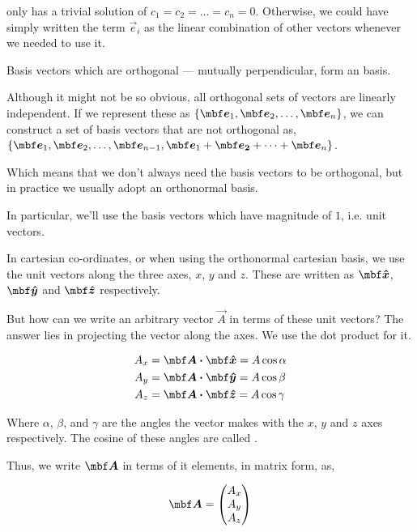 only has a trivial solution of \(c_1 = c_2 = \dots = c_n = 0\). Otherwise, we could have simply written the term \(\vec{e}_i\) as the linear combination of other vectors whenever we needed to use it.

Basis vectors which are orthogonal --- mutually perpendicular, form an  basis.

Although it might not be so obvious, all orthogonal sets of vectors are linearly 
independent. If we represent these as \(\Set{\vec{e}_1, \vec{e}_2, \dots, \vec{e}_n}\), we
can construct a set of basis vectors that are not orthogonal as,
\(\Set{\vec{e}_1, \vec{e}_2, \dots, \vec{e}_{n-1}, \vec{e}_1 + \vec{e_2} + \dots + \vec{e}_n}\).

Which means that we don't always need the basis vectors to be orthogonal, but
in practice we usually adopt an orthonormal basis.

In particular, we'll use the basis vectors which have magnitude of \(1\), i.e. unit vectors.

In cartesian co-ordinates, or when using the orthonormal cartesian basis, we use the unit vectors along the three axes, \(x\), \(y\) and 
\(z\). These are written as \(\unitv{x}\), \(\unitv{y}\) and \(\unitv{z}\) respectively.

But how can we write an arbitrary vector \(\vec{A}\) in terms of these unit vectors?
The answer lies in projecting the vector along the axes. We use the dot product for it.

\begin{align}
    A_x &= \Aa \dtp \unitv{x} = A \cos \alpha \\
    A_y &= \Aa \dtp \unitv{y} = A \cos \beta \\
    A_z &= \Aa \dtp \unitv{z} = A \cos \gamma 
\end{align}

Where \(\alpha\), \(\beta\), and \(\gamma\) are the angles 
the vector makes with the \(x\), \(y\) and \(z\) axes respectively.
The cosine of these angles are called . 

Thus, we write \(\Aa\) in terms of it elements, in matrix form, as, 

\begin{equation}
    \Aa = 
    \begin{pmatrix}
        A_x \\
        A_y \\
        A_z
    \end{pmatrix}
\end{equation}
    

